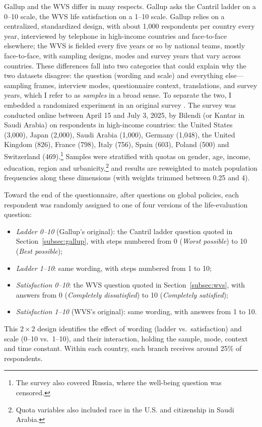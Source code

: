 \documentclass[12pt]{article}
\begin{document}
Gallup and the WVS differ in many respects. Gallup asks the Cantril ladder on a 0--10 scale, the WVS life satisfaction on a 1--10 scale. Gallup relies on a centralized, standardized design, with about 1,000 respondents per country every year, interviewed by telephone in high-income countries and face-to-face elsewhere; the WVS is fielded every five years or so by national teams, mostly face-to-face, with sampling designs, modes and survey years that vary across countries. These differences fall into two categories that could explain why the two datasets disagree: the question (wording and scale) and everything else---sampling frames, interview modes, questionnaire context, translations, and survey years, which I refer to as \textit{samples} in a broad sense. To separate the two, I embedded a randomized experiment in an original survey \citeownsurvey. The survey was conducted online between April 15 and July 3, 2025, by Bilendi (or Kantar in Saudi Arabia) on \nFabre respondents in \nFabreCountries high-income countries: the United States (3,000), Japan (2,000), Saudi Arabia (1,000), Germany (1,048), the United Kingdom (826), France (798), Italy (756), Spain (603), Poland (500) and Switzerland (469).\footnote{The survey also covered Russia, where the well-being question was censored.} Samples were stratified with quotas on gender, age, income, education, region and urbanicity,\footnote{Quota variables also included race in the U.S. and citizenship in Saudi Arabia.} and results are reweighted to match population frequencies along these dimensions (with weights trimmed between 0.25 and 4).

Toward the end of the questionnaire, after questions on global policies, each respondent was randomly assigned to one of four versions of the life-evaluation question:
\begin{itemize}
    \item \textit{Ladder 0--10} (Gallup's original): the Cantril ladder question quoted in Section~\ref{subsec:gallup}, with steps numbered from 0 (\textit{Worst possible}) to 10 (\textit{Best possible});
    \item \textit{Ladder 1--10}: same wording, with steps numbered from 1 to 10;
    \item \textit{Satisfaction 0--10}: the WVS question quoted in Section~\ref{subsec:wvs}, with answers from 0 (\textit{Completely dissatisfied}) to 10 (\textit{Completely satisfied});
    \item \textit{Satisfaction 1--10} (WVS's original): same wording, with answers from 1 to 10.
\end{itemize}
This $2 \times 2$ design identifies the effect of wording (ladder vs.\ satisfaction) and scale (0--10 vs.\ 1--10), and their interaction, holding the sample, mode, context and time constant. Within each country, each branch receives around 25\% of respondents.
\end{document}
